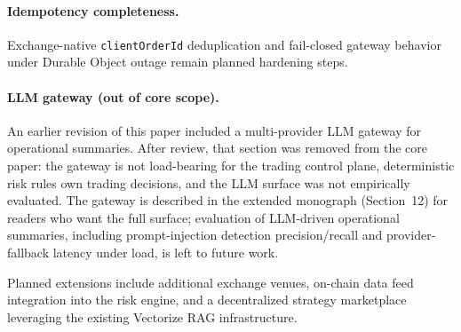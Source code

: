 \paragraph{Idempotency completeness.} Exchange-native \texttt{clientOrderId} deduplication and fail-closed gateway behavior under Durable Object outage remain planned hardening steps.

\paragraph{LLM gateway (out of core scope).} An earlier revision of this paper included a multi-provider LLM gateway for operational summaries. After review, that section was removed from the core paper: the gateway is not load-bearing for the trading control plane, deterministic risk rules own trading decisions, and the LLM surface was not empirically evaluated. The gateway is described in the extended monograph (Section~12) for readers who want the full surface; evaluation of LLM-driven operational summaries, including prompt-injection detection precision/recall and provider-fallback latency under load, is left to future work.

Planned extensions include additional exchange venues, on-chain data feed integration into the risk engine, and a decentralized strategy marketplace leveraging the existing Vectorize RAG infrastructure.
